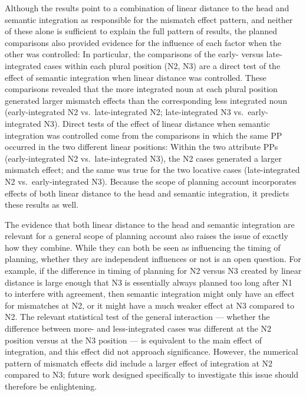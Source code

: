\documentclass[12pt,titlepage]{article}
\newcommand{\NOTE}[1]{\textbf{*** #1 ***}}  %
\newcommand{\IGNORE}[1]{} %
\begin{document}
Although the results point to a combination of linear distance to the head
and semantic integration as responsible for the mismatch effect pattern,
and neither of these alone is sufficient to explain the full pattern of
results, the planned comparisons also provided evidence for the influence
of each factor when the other was controlled: In particular, the
comparisons of the early- versus late-integrated cases within each plural
position (N2, N3) are a direct test of the effect of semantic integration
when linear distance was controlled.  These comparisons revealed that the
more integrated noun at each plural position generated larger mismatch
effects than the corresponding less integrated noun (early-integrated N2
vs.\ late-integrated N2; late-integrated N3 vs.\ early-integrated N3).
Direct tests of the effect of linear distance when semantic integration was
controlled come from the comparisons in which the same PP occurred in the
two different linear positions: Within the two attribute PPs
(early-integrated N2 vs.\ late-integrated N3), the N2 cases generated a
larger mismatch effect; and the same was true for the two locative cases
(late-integrated N2 vs.\ early-integrated N3).  Because the scope of
planning account incorporates effects of both linear distance to the head
and semantic integration, it predicts these results as well.

\IGNORE{
\NOTE{this para was in original HP2 ms but apparently not in this 
one; we may want it or some version of it, either here or in GD:} --- keep 
it here}

The evidence that both linear distance to the head and semantic integration
are relevant for a general scope of planning account also raises the issue
of exactly how they combine.  While they can both be seen as influencing
the timing of planning, whether they are independent influences or not is
an open question.  For example, if the difference in timing of planning for
N2 versus N3 created by linear distance is large enough that N3 is
essentially always planned too long after N1 to interfere with agreement,
then semantic integration might only have an effect for mismatches at N2,
or it might have a much weaker effect at N3 compared to N2.  The relevant
statistical test of the general interaction --- whether the difference
between more- and less-integrated cases was different at the N2 position
versus at the N3 position --- is equivalent to the main effect of
integration, and this effect did not approach significance.  However, the
numerical pattern of mismatch effects did include a larger effect of
integration at N2 compared to N3; future work designed specifically to
investigate this issue should therefore be enlightening.
\end{document}
